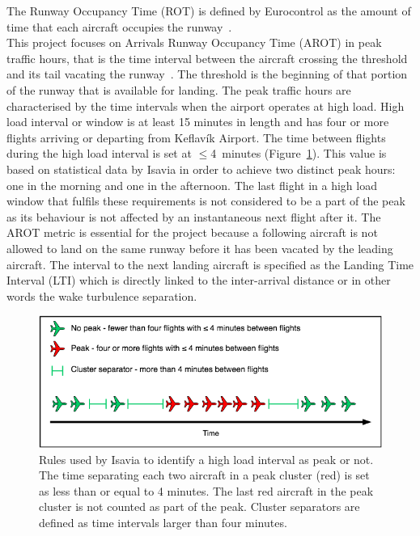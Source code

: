 The Runway Occupancy Time (ROT) is defined by Eurocontrol as the amount of time that each aircraft occupies the runway~\cite{ROT_definition}. \\
This project focuses on Arrivals Runway Occupancy Time (AROT) in peak traffic hours, that is the time interval between the aircraft crossing the threshold and its tail vacating the runway~\cite{AROT_definition}. The threshold is the beginning of that portion of the runway that is available for landing.
The peak traffic hours are characterised by the time intervals when the airport operates at high load. High load interval or window is at least 15 minutes in length and has four or more flights arriving or departing from Keflavík Airport. The time between flights during the high load interval is set at $\leq$4~minutes (Figure~\ref{fig:Peak_Diagram}). This value is based on statistical data by Isavia in order to achieve two distinct peak hours: one in the morning and one in the afternoon. The last flight in a high load window that fulfils these requirements is not considered to be a part of the peak as its behaviour is not affected by an instantaneous next flight after it. The AROT metric is essential for the project because a following aircraft is not allowed to land on the same runway before it has been vacated by the leading aircraft. The interval to the next landing aircraft is specified as the Landing Time Interval (LTI) which is directly linked to the inter-arrival distance or in other words the wake turbulence separation.

\begin{figure}[h]
    \centering
    \includegraphics[width=1\textwidth]{graphics/Peak_Diagram.png}
    \caption[Rules defining a peak hour]{Rules used by Isavia to identify a high load interval as peak or not. The time separating each two aircraft in a peak cluster (red) is set as less than or equal to 4 minutes. The last red aircraft in the peak cluster is not counted as part of the peak. Cluster separators are defined as time intervals larger than four minutes.}
    \label{fig:Peak_Diagram}
\end{figure}


